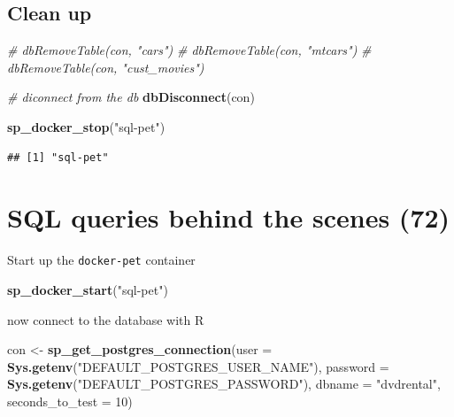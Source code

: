\documentclass[]{book}
\newenvironment{Shaded}{\begin{snugshade}}{\end{snugshade}}
\newcommand{\CommentTok}[1]{\textcolor[rgb]{0.56,0.35,0.01}{\textit{#1}}}
\newcommand{\DataTypeTok}[1]{\textcolor[rgb]{0.13,0.29,0.53}{#1}}
\newcommand{\DecValTok}[1]{\textcolor[rgb]{0.00,0.00,0.81}{#1}}
\newcommand{\KeywordTok}[1]{\textcolor[rgb]{0.13,0.29,0.53}{\textbf{#1}}}
\newcommand{\NormalTok}[1]{#1}
\newcommand{\StringTok}[1]{\textcolor[rgb]{0.31,0.60,0.02}{#1}}
\theoremstyle{definition}
\theoremstyle{definition}
\theoremstyle{definition}
\theoremstyle{remark}
\begin{document}
\hypertarget{clean-up-1}{%
\section{Clean up}\label{clean-up-1}}

\begin{Shaded}
\begin{Highlighting}[]
\CommentTok{# dbRemoveTable(con, "cars")}
\CommentTok{# dbRemoveTable(con, "mtcars")}
\CommentTok{# dbRemoveTable(con, "cust_movies")}

\CommentTok{# diconnect from the db}
\KeywordTok{dbDisconnect}\NormalTok{(con)}

\KeywordTok{sp_docker_stop}\NormalTok{(}\StringTok{"sql-pet"}\NormalTok{)}
\end{Highlighting}
\end{Shaded}

\begin{verbatim}
## [1] "sql-pet"
\end{verbatim}

\hypertarget{sql-queries-behind-the-scenes-72}{%
\chapter{SQL queries behind the scenes
(72)}\label{sql-queries-behind-the-scenes-72}}

Start up the \texttt{docker-pet} container

\begin{Shaded}
\begin{Highlighting}[]
\KeywordTok{sp_docker_start}\NormalTok{(}\StringTok{"sql-pet"}\NormalTok{)}
\end{Highlighting}
\end{Shaded}

now connect to the database with R

\begin{Shaded}
\begin{Highlighting}[]
\NormalTok{con <-}\StringTok{ }\KeywordTok{sp_get_postgres_connection}\NormalTok{(}\DataTypeTok{user =} \KeywordTok{Sys.getenv}\NormalTok{(}\StringTok{"DEFAULT_POSTGRES_USER_NAME"}\NormalTok{),}
                         \DataTypeTok{password =} \KeywordTok{Sys.getenv}\NormalTok{(}\StringTok{"DEFAULT_POSTGRES_PASSWORD"}\NormalTok{),}
                         \DataTypeTok{dbname =} \StringTok{"dvdrental"}\NormalTok{,}
                         \DataTypeTok{seconds_to_test =} \DecValTok{10}\NormalTok{)}
\end{Highlighting}
\end{Shaded}
\end{document}
